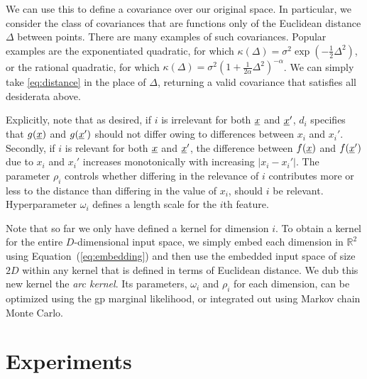 \documentclass{article}
\newcommand{\vect}[1]{\underline{\smash{#1}}}
\renewcommand{\v}[1]{\vect{#1}}
\newcommand{\br}{}%
\newcommand{\note}[1]{}
\newcommand{\gp}{{\sc gp}}
\begin{document}
We can use this to define a covariance over our original space. In particular, we consider the class of covariances that are functions only of the Euclidean distance $\Delta$ between points. There are many examples of such covariances. Popular examples are the exponentiated quadratic, for which $\kappa(\Delta) = \sigma^2 \exp(-\frac{1}{2} \Delta^2)$, or the rational quadratic, for which $\kappa(\Delta) = \sigma^2 (1+\frac{1}{2\alpha} \Delta^2)^{-\alpha}$. We can simply take \eqref{eq:distance} in the place of $\Delta$, returning a valid covariance that satisfies all desiderata above. 


Explicitly, note that as desired, if $i$ is irrelevant for both $\v{x}$ and $\v{x}'$, $d\br_i$ specifies that $g(\v{x})$ and $g(\v{x}')$ should not differ owing to differences between $x_i$ and $x_i'$. Secondly, if $i$ is relevant for both $\v{x}$ and $\v{x}'$, the difference between $f(\v{x})$ and $f(\v{x}')$ due to $x_i$ and $x_i'$ increases monotonically with increasing $\left|x_i-x_i'\right|$. The parameter $\rho_i$ controls whether differing in the relevance of $i$ contributes more or less to the distance than differing in the value of $x_i$, should $i$ be relevant. 
%
%
%
%
Hyperparameter $\omega_i$ defines a length scale for the $i$th feature. 

Note that so far we only have defined a kernel for dimension $i$. To obtain a kernel for the entire $D$-dimensional input space, we simply embed each dimension in $\mathbb{R}^2$ using Equation~(\ref{eq:embedding}) and then use the embedded input space of size $2D$ within any kernel that is defined in terms of Euclidean distance.
We dub this new kernel the \emph{arc kernel}. Its parameters, $\omega_i$ and $\rho_i$ for each dimension, can be optimized using the \gp{} marginal likelihood, or integrated out using Markov chain Monte Carlo.


\section{Experiments}
\vspace{-0.05in} 
\end{document}
